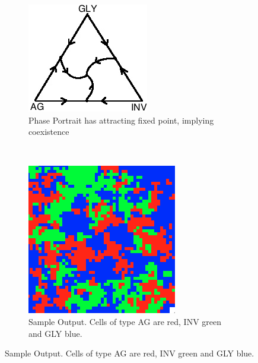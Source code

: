 \documentclass[12pt]{amsart}
\begin{document}
\begin{figure}[ht]

	\begin{subfigure}[b]{0.4 \textwidth}
		\includegraphics[width = 0.9 \textwidth]{Diagrams/Basanta/phase}
		\caption{Phase Portrait has attracting fixed point, implying coexistence}
	\end{subfigure}
	~
	\begin{subfigure}[b]{0.4 \textwidth}
		\includegraphics[width = 0.9 \textwidth]{Diagrams/Basanta/sample}
		\caption{Sample Output. Cells of type AG are red, INV green and GLY blue.}
	\end{subfigure}


\end{figure}
\end{document}
